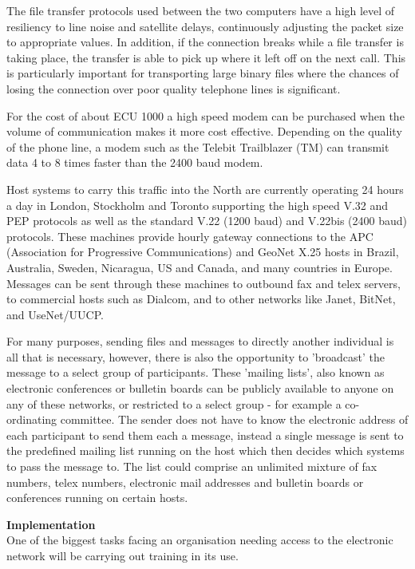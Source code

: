 The file transfer protocols used between the two computers have a high
level of resiliency to line noise and satellite delays, continuously
adjusting the packet size to appropriate values. In addition, if the
connection breaks while a file transfer is taking place, the transfer is
able to pick up where it left off on the next call. This is particularly
important for transporting large binary files where the chances of losing
the connection over poor quality telephone lines is significant.

For the cost of about ECU 1000 a high speed modem can be purchased when
the volume of communication makes it more cost effective. Depending on the
quality of the phone line, a modem such as the Telebit Trailblazer (TM)
can transmit data 4 to 8 times faster than the 2400 baud modem.

Host systems to carry this traffic into the North are currently operating
24 hours a day in London, Stockholm and Toronto supporting the high speed
V.32 and PEP protocols as well as the standard V.22 (1200 baud) and V.22bis
(2400 baud) protocols. These machines provide hourly gateway connections to
the APC (Association for Progressive Communications) and GeoNet X.25 hosts
in Brazil, Australia, Sweden, Nicaragua, US and Canada, and many countries in
Europe. Messages can be sent through these machines to outbound fax and
telex servers, to commercial hosts such as Dialcom, and to other networks
like Janet, BitNet, and UseNet/UUCP.

For many purposes, sending files and messages to directly another
individual is all that is necessary, however, there is also the opportunity
to 'broadcast' the message to a select group of participants. These
'mailing lists', also known as electronic conferences or bulletin boards
can be publicly available to anyone on any of these networks, or restricted
to a select group - for example a co-ordinating committee. The sender does
not have to know the electronic address of each participant to send them
each a message, instead a single message is sent to the predefined mailing
list running on the host which then decides which systems to pass the
message to. The list could comprise an unlimited mixture of fax numbers,
telex numbers, electronic mail addresses and bulletin boards or conferences
running on certain hosts.

{\bf Implementation}\\
One of the biggest tasks facing an organisation needing access to the
electronic network will be carrying out training in its use.

